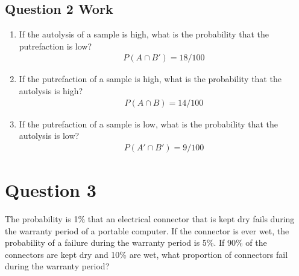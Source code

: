 \documentclass[../INDE315_HW.tex]{subfiles}
\begin{document}
\subsection*{Question 2 Work}
\begin{enumerate}
    \item If the autolysis of a sample is high, what is the probability that the putrefaction is low?
        \begin{equation*}
            \begin{aligned}
                P(A \cap B') = 18/100
            \end{aligned}
        \end{equation*}
    \item If the putrefaction of a sample is high, what is the probability that the autolysis is high?
        \begin{equation*}
            \begin{aligned}
                P(A \cap B) = 14/100
            \end{aligned}
        \end{equation*}
    \item If the putrefaction of a sample is low, what is the probability that the autolysis is low? 
        \begin{equation*}
            \begin{aligned}
                P(A' \cap B') = 9/100
            \end{aligned}
        \end{equation*}
\end{enumerate}

\section*{Question 3}
The probability is 1\% that an electrical connector that is kept dry fails during the warranty period of a portable computer. If the connector is ever wet, the probability of a failure during the warranty period is 5\%. If 90\% of the connectors are kept dry and 10\% are wet, what proportion of connectors fail during the warranty period?
\end{document}
